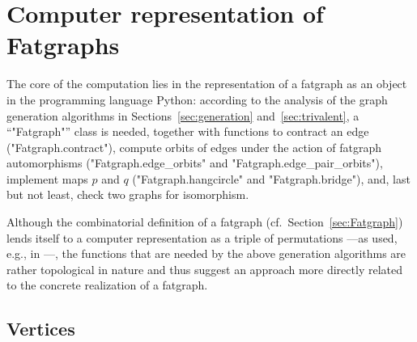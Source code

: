 \section{Computer representation of Fatgraphs}
\label{sec:fatgraph-representation}

The core of the computation lies in the representation of a fatgraph
as an object in the programming language Python: according to the
analysis of the graph generation algorithms in
Sections~\ref{sec:generation} and~\ref{sec:trivalent}, a
``"Fatgraph"'' class is needed, together with functions to contract an
edge ("Fatgraph.contract"), compute orbits of edges under the action
of fatgraph automorphisms ("Fatgraph.edge_orbits" and
"Fatgraph.edge_pair_orbits"), implement maps $p$ and $q$
("Fatgraph.hangcircle" and "Fatgraph.bridge"), and, last but not
least, check two graphs for isomorphism.

Although the combinatorial definition of a fatgraph
(cf.~Section~\ref{sec:Fatgraph}) lends itself to a computer
representation as a triple of permutations ---as used, e.g., in
\cite[Section 2.4]{arXiv:0902.1025}---, the functions that are needed
by the above generation algorithms are rather topological in nature
and thus suggest an approach more directly related to the concrete
realization of a fatgraph.

\subsection{Vertices}
\label{sec:vertices}

